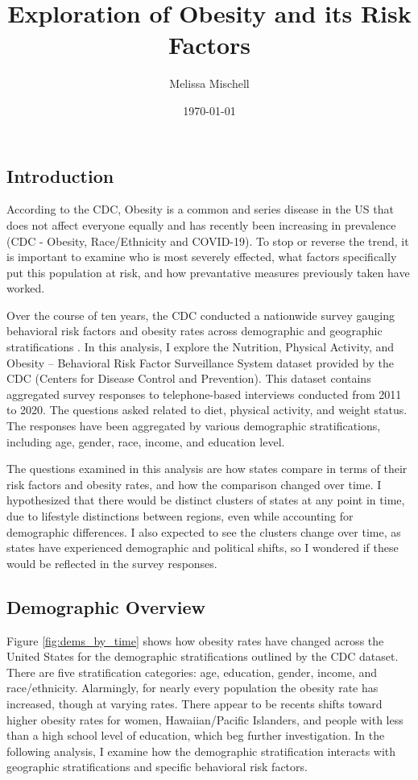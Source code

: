 \documentclass[11pt]{article}
\title{Exploration of Obesity and its Risk Factors}
\author{Melissa Mischell}
\date{\today}
\makeatletter
\newcommand{\citeprocitem}[2]{\hyper@linkstart{cite}{citeproc_bib_item_#1}#2\hyper@linkend}
\makeatother
\begin{document}
\maketitle

\subsection{Introduction}
According to the CDC, Obesity is a common and series disease in the US that does not affect everyone equally and has recently been increasing in prevalence (\citeprocitem{1}{CDC - Obesity, Race/Ethnicity and COVID-19}). To stop or reverse the trend, it is important to examine who is most severely effected, what factors specifically put this population at risk, and how prevantative measures previously taken have worked.

Over the course of ten years, the CDC conducted a nationwide survey gauging behavioral risk factors and obesity rates across demographic and geographic stratifications . In this analysis, I explore the Nutrition, Physical Activity, and Obesity – Behavioral Risk Factor Surveillance System dataset provided by the CDC (\citeprocitem{2}{Centers for Disease Control and Prevention}). This dataset contains aggregated survey responses to telephone-based interviews conducted from 2011 to 2020. The questions asked related to diet, physical activity, and weight status. The responses have been aggregated by various demographic stratifications, including age, gender, race, income, and education level.

The questions examined in this analysis are how states compare in terms of their risk factors and obesity rates, and how the comparison changed over time. I hypothesized that there would be distinct clusters of states at any point in time, due to lifestyle distinctions between regions, even while accounting for demographic differences. I also expected to see the clusters change over time, as states have experienced demographic and political shifts, so I wondered if these would be reflected in the survey responses.

\subsection{Demographic Overview}
Figure \ref{fig:dems_by_time} shows how obesity rates have changed across the United States for the demographic stratifications outlined by the CDC dataset. There are five stratification categories: age, education, gender, income, and race/ethnicity. Alarmingly, for nearly every population the obesity rate has increased, though at varying rates. There appear to be recents shifts toward higher obesity rates for women, Hawaiian/Pacific Islanders, and people with less than a high school level of education, which beg further investigation. In the following analysis, I examine how the demographic stratification interacts with geographic stratifications and specific behavioral risk factors.
\end{document}
